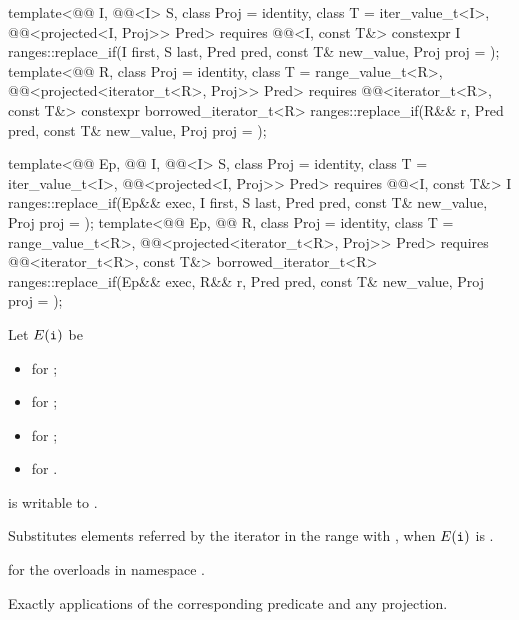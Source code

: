 \begin{itemdecl}
template<@@ I, @@<I> S, class Proj = identity,
         class T = iter_value_t<I>,
         @@<projected<I, Proj>> Pred>
  requires @@<I, const T&>
  constexpr I ranges::replace_if(I first, S last, Pred pred, const T& new_value, Proj proj = {});
template<@@ R, class Proj = identity, class T = range_value_t<R>,
         @@<projected<iterator_t<R>, Proj>> Pred>
  requires @@<iterator_t<R>, const T&>
  constexpr borrowed_iterator_t<R>
    ranges::replace_if(R&& r, Pred pred, const T& new_value, Proj proj = {});

template<@@ Ep, @@ I, @@<I> S,
         class Proj = identity, class T = iter_value_t<I>,
         @@<projected<I, Proj>> Pred>
  requires @@<I, const T&>
  I ranges::replace_if(Ep&& exec, I first, S last, Pred pred,
                       const T& new_value, Proj proj = {});
template<@@ Ep, @@ R, class Proj = identity,
         class T = range_value_t<R>,
         @@<projected<iterator_t<R>, Proj>> Pred>
  requires @@<iterator_t<R>, const T&>
  borrowed_iterator_t<R>
    ranges::replace_if(Ep&& exec, R&& r, Pred pred, const T& new_value, Proj proj = {});
\end{itemdecl}

\begin{itemdescr}
\pnum
Let $E(\tcode{i})$ be
\begin{itemize}
\item {} for ;
\item {} for ;
\item {} for ;
\item {} for .
\end{itemize}

\pnum
\mandates
{} is writable to .

\pnum
\effects
Substitutes elements referred by the iterator 
in the range  with ,
when $E(\tcode{i})$ is .

\pnum
\returns
{} for the overloads in namespace .

\pnum
\complexity
Exactly  applications
of the corresponding predicate and any projection.
\end{itemdescr}

